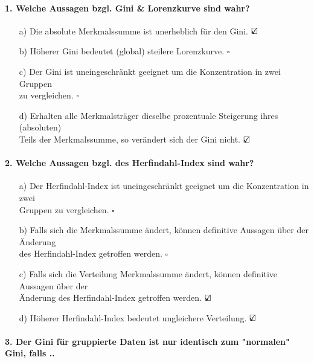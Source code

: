 \documentclass[a4paper]{article}
\begin{document}
\paragraph{1. Welche Aussagen bzgl. Gini \& Lorenzkurve sind wahr?}

\begin{itemize}
    \item[a)] Die absolute Merkmalssumme ist unerheblich für den Gini. \hfill $\text{\rlap{$\checkmark$}}\square$
    \item[b)] Höherer Gini bedeutet (global) steilere Lorenzkurve. \hfill $\square$
    \item[c)] Der Gini ist uneingeschränkt geeignet um die Konzentration in zwei Gruppen\\zu vergleichen. \hfill $\square$
    \item[d)] Erhalten alle Merkmalsträger dieselbe prozentuale Steigerung ihres (absoluten)\\Teils der Merkmalssumme, so verändert sich der Gini nicht. \hfill $\text{\rlap{$\checkmark$}}\square$
\end{itemize}

\paragraph{2. Welche Aussagen bzgl. des Herfindahl-Index sind wahr?}

\begin{itemize}
    \item[a)] Der Herfindahl-Index ist uneingeschränkt geeignet um die Konzentration in zwei\\Gruppen zu vergleichen. \hfill $\square$
    \item[b)] Falls sich die Merkmalssumme ändert, können definitive Aussagen über der Änderung\\des Herfindahl-Index getroffen werden. \hfill $\square$
    \item[c)] Falls sich die Verteilung Merkmalssumme ändert, können definitive Aussagen über der\\Änderung des Herfindahl-Index getroffen werden. \hfill $\text{\rlap{$\checkmark$}}\square$
    \item[d)] Höherer Herfindahl-Index bedeutet ungleichere Verteilung. \hfill $\text{\rlap{$\checkmark$}}\square$
\end{itemize}

\paragraph{3. Der Gini für gruppierte Daten ist nur identisch zum "normalen" Gini, falls ..}
\end{document}
